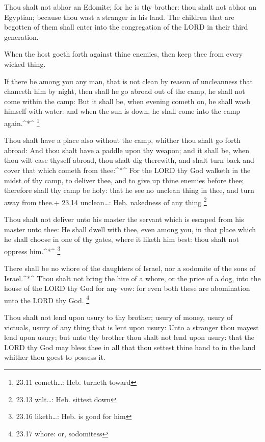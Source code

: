  Thou shalt not abhor an Edomite; for he is thy brother:
thou shalt not abhor an Egyptian; because thou wast a stranger in his
land.  The children that are begotten of them shall enter
into the congregation of the LORD in their third generation.

 When the host goeth forth against thine enemies, then keep
thee from every wicked thing.

 If there be among you any man, that is not clean by reason
of uncleanness that chanceth him by night, then shall he go abroad out
of the camp, he shall not come within the camp:  But it
shall be, when evening cometh on, he shall wash himself with water: and
when the sun is down, he shall come into the camp again.\^{}*\^{}
\footnote{23.11 cometh\ldots: Heb. turneth toward}

 Thou shalt have a place also without the camp, whither
thou shalt go forth abroad:  And thou shalt have a paddle
upon thy weapon; and it shall be, when thou wilt ease thyself abroad,
thou shalt dig therewith, and shalt turn back and cover that which
cometh from thee:\^{}*\^{}  For the LORD thy God walketh in
the midst of thy camp, to deliver thee, and to give up thine enemies
before thee; therefore shall thy camp be holy: that he see no unclean
thing in thee, and turn away from thee.+ 23.14 unclean\ldots: Heb.
nakedness of any thing \footnote{23.13 wilt\ldots: Heb. sittest down}

 Thou shalt not deliver unto his master the servant which
is escaped from his master unto thee:  He shall dwell with
thee, even among you, in that place which he shall choose in one of thy
gates, where it liketh him best: thou shalt not oppress him.\^{}*\^{}
\footnote{23.16 liketh\ldots: Heb. is good for him}

 There shall be no whore of the daughters of Israel, nor a
sodomite of the sons of Israel.\^{}*\^{}  Thou shalt not
bring the hire of a whore, or the price of a dog, into the house of the
LORD thy God for any vow: for even both these are abomination unto the
LORD thy God. \footnote{23.17 whore: or, sodomitess}

 Thou shalt not lend upon usury to thy brother; usury of
money, usury of victuals, usury of any thing that is lent upon usury:
 Unto a stranger thou mayest lend upon usury; but unto thy
brother thou shalt not lend upon usury: that the LORD thy God may bless
thee in all that thou settest thine hand to in the land whither thou
goest to possess it.

